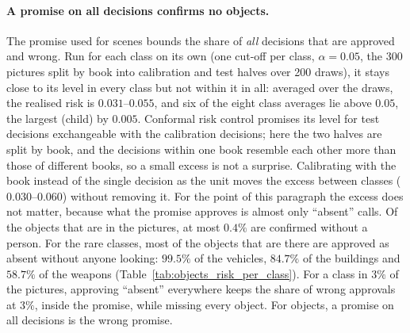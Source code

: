 \paragraph{A promise on all decisions confirms no objects.} The promise used for scenes bounds the share of \emph{all} decisions that are approved and wrong. Run for each class on its own (one cut-off per class, $\alpha = 0.05$, the 300 pictures split by book into calibration and test halves over 200 draws), it stays close to its level in every class but not within it in all: averaged over the draws, the realised risk is $0.031$--$0.055$, and six of the eight class averages lie above $0.05$, the largest (child) by $0.005$. Conformal risk control promises its level for test decisions exchangeable with the calibration decisions; here the two halves are split by book, and the decisions within one book resemble each other more than those of different books, so a small excess is not a surprise. Calibrating with the book instead of the single decision as the unit moves the excess between classes ($0.030$--$0.060$) without removing it. For the point of this paragraph the excess does not matter, because what the promise approves is almost only ``absent'' calls. Of the objects that are in the pictures, at most $0.4\%$ are confirmed without a person. For the rare classes, most of the objects that are there are approved as absent without anyone looking: $99.5\%$ of the vehicles, $84.7\%$ of the buildings and $58.7\%$ of the weapons (Table~\ref{tab:objects_risk_per_class}). For a class in $3\%$ of the pictures, approving ``absent'' everywhere keeps the share of wrong approvals at $3\%$, inside the promise, while missing every object. For objects, a promise on all decisions is the wrong promise.

